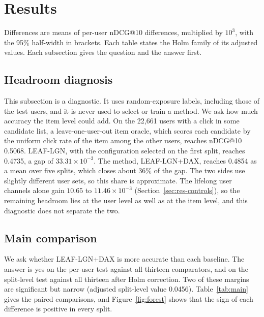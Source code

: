\section{Results}
\label{sec:results}

Differences are means of per-user nDCG@10 differences, multiplied by $10^{3}$, with the 95\% half-width in brackets. Each table states
the Holm family of its adjusted values. Each subsection gives the question and the answer first.

\subsection{Headroom diagnosis}
\label{sec:res-headroom}

This subsection is a diagnostic. It uses random-exposure labels, including those of the test users, and it is never used to select or train a
method. We ask how much accuracy the item level could add. On the 22,661 users with a click in some candidate list, a leave-one-user-out item
oracle, which scores each candidate by the uniform click rate of the item among the other users, reaches nDCG@10 0.5068. LEAF-LGN, with the
configuration selected on the first split, reaches 0.4735, a gap of $33.31\times10^{-3}$. The method, LEAF-LGN+DAX, reaches 0.4854 as a mean over
five splits, which closes about 36\% of the gap. The two sides use slightly different user sets, so this share is approximate. The lifelong user
channels alone gain $10.65$ to $11.46\times10^{-3}$ (Section~\ref{sec:res-controls}), so the remaining headroom lies at the user level as well as at
the item level, and this diagnostic does not separate the two.

\subsection{Main comparison}
\label{sec:res-main}

We ask whether LEAF-LGN+DAX is more accurate than each baseline. The answer is yes on the per-user test against all thirteen comparators, and on the
split-level test against all thirteen after Holm correction. Two of these margins are significant but narrow (adjusted split-level value 0.0456). Table~\ref{tab:main} gives the paired
comparisons, and Figure~\ref{fig:forest} shows that the sign of each difference is positive in every split.

